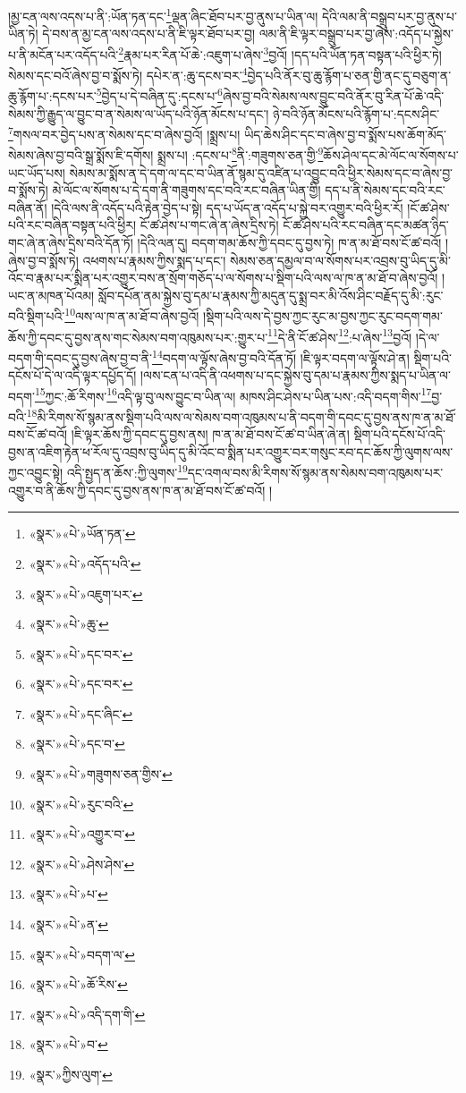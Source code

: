 །མྱ་ངན་ལས་འདས་པ་ནི་:ཡོན་ཏན་དང་\footnote{«སྣར་»«པེ་»ཡོན་ཏན་}ལྡན་ཞིང་ཐོབ་པར་བྱ་ནུས་པ་ཡིན་ལ། དེའི་ལམ་ནི་བསྒྲུབ་པར་བྱ་ནུས་པ་ཡིན་ཏེ། དེ་བས་ན་མྱ་ངན་ལས་འདས་པ་ནི་ཇི་ལྟར་ཐོབ་པར་བྱ། ལམ་ནི་ཇི་ལྟར་བསྒྲུབ་པར་བྱ་ཞེས་:འདོད་པ་སྐྱེས་པ་ནི་མངོན་པར་འདོད་པའི་\footnote{«སྣར་»«པེ་»འདོད་པའི་}རྣམ་པར་རིན་པོ་ཆེ་:འཇུག་པ་ཞེས་\footnote{«སྣར་»«པེ་»འཇུག་པར་}བྱའོ། །དད་པའི་ཡོན་ཏན་བསྟན་པའི་ཕྱིར་ཏེ། སེམས་དང་བའོ་ཞེས་བྱ་བ་སྨོས་ཏེ། དཔེར་ན་:ཆུ་དངས་བར་\footnote{«སྣར་»«པེ་»ཆུ་}བྱེད་པའི་ནོར་བུ་ཆུ་རྙོག་པ་ཅན་གྱི་ནང་དུ་བཅུག་ན་ཆུ་རྙོག་པ་:དངས་པར་\footnote{«སྣར་»«པེ་»དང་བར་}བྱེད་པ་དེ་བཞིན་དུ་:དངས་པ་\footnote{«སྣར་»«པེ་»དང་བར་}ཞེས་བྱ་བའི་སེམས་ལས་བྱུང་བའི་ནོར་བུ་རིན་པོ་ཆེ་འདི་སེམས་ཀྱི་རྒྱུད་ལ་བྱུང་བ་ན་སེམས་ལ་ཡོད་པའི་ཉོན་མོངས་པ་དང་། ཉེ་བའི་ཉོན་མོངས་པའི་རྙོག་པ་:དངས་ཤིང་\footnote{«སྣར་»«པེ་»དང་ཞིང་}གསལ་བར་བྱེད་པས་ན་སེམས་དང་བ་ཞེས་བྱའོ། །སྨྲས་པ། ཡིད་ཆེས་ཤིང་དང་བ་ཞེས་བྱ་བ་སྨོས་པས་ཆོག་མོད་སེམས་ཞེས་བྱ་བའི་སྒྲ་སྨོས་ཇི་དགོས། སྨྲས་པ། :དངས་པ་\footnote{«སྣར་»«པེ་»དང་བ་}ནི་:གཟུགས་ཅན་གྱི་\footnote{«སྣར་»«པེ་»གཟུགས་ཅན་གྱིས་}ཆོས་ཤེལ་དང་མེ་ལོང་ལ་སོགས་པ་ཡང་ཡོད་པས། སེམས་མ་སྨོས་ན་དེ་དག་ལ་དང་བ་ཡིན་ནོ་སྙམ་དུ་འཛིན་པ་འབྱུང་བའི་ཕྱིར་སེམས་དང་བ་ཞེས་བྱ་བ་སྨོས་ཏེ། མེ་ལོང་ལ་སོགས་པ་དེ་དག་ནི་གཟུགས་དང་བའི་རང་བཞིན་ཡིན་གྱི། དད་པ་ནི་སེམས་དང་བའི་རང་བཞིན་ནོ། །དེའི་ལས་ནི་འདོད་པའི་རྟེན་བྱེད་པ་སྟེ། དད་པ་ཡོད་ན་འདོད་པ་སྐྱེ་བར་འགྱུར་བའི་ཕྱིར་རོ། །ངོ་ཚ་ཤེས་པའི་རང་བཞིན་བསྟན་པའི་ཕྱིར། ངོ་ཚ་ཤེས་པ་གང་ཞེ་ན་ཞེས་དྲིས་ཏེ། ངོ་ཚ་ཤེས་པའི་རང་བཞིན་དང་མཚན་ཉིད་གང་ཞེ་ན་ཞེས་དྲིས་བའི་དོན་ཏོ། །དེའི་ལན་དུ། བདག་གམ་ཆོས་ཀྱི་དབང་དུ་བྱས་ཏེ། ཁ་ན་མ་ཐོ་བས་ངོ་ཚ་བའོ། །ཞེས་བྱ་བ་སྨོས་ཏེ། འཕགས་པ་རྣམས་ཀྱིས་སྨད་པ་དང་། སེམས་ཅན་དམྱལ་བ་ལ་སོགས་པར་འབྲས་བུ་ཡིད་དུ་མི་འོང་བ་རྣམ་པར་སྨིན་པར་འགྱུར་བས་ན་སྲོག་གཅོད་པ་ལ་སོགས་པ་སྡིག་པའི་ལས་ལ་ཁ་ན་མ་ཐོ་བ་ཞེས་བྱའོ། །ཡང་ན་མཁན་པོའམ། སློབ་དཔོན་ནམ་སྐྱེས་བུ་དམ་པ་རྣམས་ཀྱི་མདུན་དུ་སྨྲ་བར་མི་འོས་ཤིང་བརྗོད་དུ་མི་:རུང་བའི་སྡིག་པའི་\footnote{«སྣར་»«པེ་»རུང་བའི་}ལས་ལ་ཁ་ན་མ་ཐོ་བ་ཞེས་བྱའོ། །སྡིག་པའི་ལས་དེ་བྱས་ཀྱང་རུང་མ་བྱས་ཀྱང་རུང་བདག་གམ་ཆོས་ཀྱི་དབང་དུ་བྱས་ནས་གང་སེམས་བག་འཁུམས་པར་:གྱུར་པ་\footnote{«སྣར་»«པེ་»འགྱུར་བ་}དེ་ནི་ངོ་ཚ་ཤེས་\footnote{«སྣར་»«པེ་»ཤེས་ཤེས་}:པ་ཞེས་\footnote{«སྣར་»«པེ་»པ་}བྱའོ། །དེ་ལ་བདག་གི་དབང་དུ་བྱས་ཞེས་བྱ་བ་ནི་\footnote{«སྣར་»«པེ་»ན་}བདག་ལ་ལྟོས་ཞེས་བྱ་བའི་དོན་ཏོ། །ཇི་ལྟར་བདག་ལ་ལྟོས་ཤེ་ན། སྡིག་པའི་དངོས་པོ་དེ་ལ་འདི་ལྟར་དཔྱོད་དོ། །ལས་ངན་པ་འདི་ནི་འཕགས་པ་དང་སྐྱེས་བུ་དམ་པ་རྣམས་ཀྱིས་སྨད་པ་ཡིན་ལ་བདག་\footnote{«སྣར་»«པེ་»བདག་ལ་}ཀྱང་:ཆོ་རིགས་\footnote{«སྣར་»«པེ་»ཆོ་རིས་}འདི་ལྟ་བུ་ལས་བྱུང་བ་ཡིན་ལ། མཁས་ཤིང་ཤེས་པ་ཡིན་པས་:འདི་བདག་གིས་\footnote{«སྣར་»«པེ་»འདི་དག་གི་}བྱ་བའི་\footnote{«སྣར་»«པེ་»བ་}མི་རིགས་སོ་སྙམ་ནས་སྡིག་པའི་ལས་ལ་སེམས་བག་འཁུམས་པ་ནི་བདག་གི་དབང་དུ་བྱས་ནས་ཁ་ན་མ་ཐོ་བས་ངོ་ཚ་བའོ། །ཇི་ལྟར་ཆོས་ཀྱི་དབང་དུ་བྱས་ནས། ཁ་ན་མ་ཐོ་བས་ངོ་ཚ་བ་ཡིན་ཞེ་ན། སྡིག་པའི་དངོས་པོ་འདི་བྱས་ན་འཇིག་རྟེན་ཕ་རོལ་དུ་འབྲས་བུ་ཡིད་དུ་མི་འོང་བ་སྨིན་པར་འགྱུར་བར་གསུང་རབ་དང་ཆོས་ཀྱི་ལུགས་ལས་ཀྱང་འབྱུང་སྟེ། འདི་སྤྱད་ན་ཆོས་:ཀྱི་ལུགས་\footnote{«སྣར་»ཀྱིས་ལུག་}དང་འགལ་བས་མི་རིགས་སོ་སྙམ་ནས་སེམས་བག་འཁུམས་པར་འགྱུར་བ་ནི་ཆོས་ཀྱི་དབང་དུ་བྱས་ནས་ཁ་ན་མ་ཐོ་བས་ངོ་ཚ་བའོ། །
